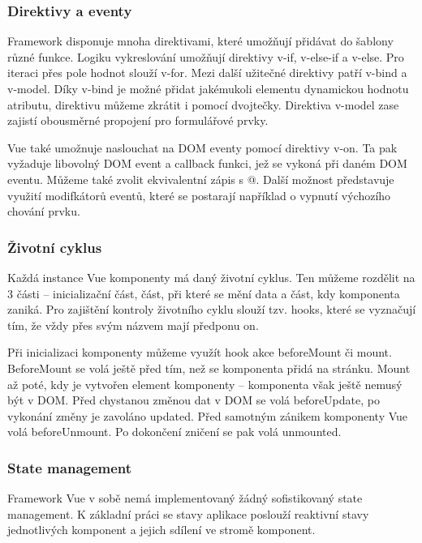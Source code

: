\subsubsection{Direktivy a eventy}

Framework disponuje mnoha direktivami, které umožňují přidávat do šablony různé funkce. Logiku vykreslování umožňují direktivy v-if, v-else-if a v-else. 
Pro iteraci přes pole hodnot slouží v-for. Mezi další užitečné direktivy patří v-bind a v-model. 
Díky v-bind je možné přidat jakémukoli elementu dynamickou hodnotu atributu, direktivu můžeme zkrátit i pomocí dvojtečky. 
Direktiva v-model zase zajistí obousměrné propojení pro formulářové prvky.

Vue také umožnuje naslouchat na DOM eventy pomocí direktivy v-on. Ta pak vyžaduje libovolný DOM event a callback funkci, jež se vykoná při daném DOM eventu. 
Můžeme také zvolit ekvivalentní zápis s @. Další možnost představuje využití modifkátorů eventů, které se postarají například o vypnutí výchozího chování prvku.\cite{vuemacrae,vue}

\subsubsection{Životní cyklus}

Každá instance Vue komponenty má daný životní cyklus. Ten můžeme rozdělit na 3 části -- inicializační část, část, při které se mění data a část, kdy komponenta zaniká. 
Pro zajištění kontroly životního cyklu slouží tzv. hooks, které se vyznačují tím, že vždy přes svým názvem mají předponu on.

Při inicializaci komponenty můžeme využít hook akce beforeMount či mount. BeforeMount se volá ještě před tím, než se komponenta přidá na stránku. 
Mount až poté, kdy je vytvořen element komponenty -- komponenta však ještě nemusý být v DOM. 
Před chystanou změnou dat v DOM se volá beforeUpdate, po vykonání změny je zavoláno updated. Před samotným zánikem komponenty Vue volá beforeUnmount. 
Po dokončení zničení se pak volá unmounted.\cite{vuemacrae,vue}

\subsubsection{State management}

Framework Vue v sobě nemá implementovaný žádný sofistikovaný state management. 
K základní práci se stavy aplikace poslouží reaktivní stavy jednotlivých komponent a jejich sdílení ve stromě komponent.

